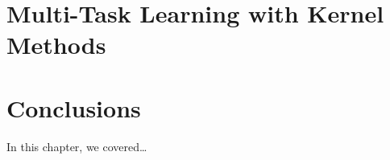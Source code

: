 
\section{Multi-Task Learning with Kernel Methods} %








\section{Conclusions}\label{sec-conclusions-2}

In this chapter, we covered\dots
